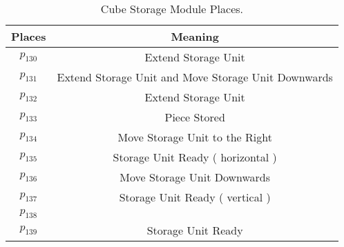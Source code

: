 \begin{table}[htbp]
\caption{Cube Storage Module Places.}
\centering
\begin{tabular}{cc}
Places & Meaning\\
\hline
\hyperlink{partialNet:p130}{\hypertarget{partialTable:p130}{$p_{130}$}} & Extend Storage Unit\\
\hyperlink{partialNet:p131}{\hypertarget{partialTable:p131}{$p_{131}$}} & Extend Storage Unit and Move Storage Unit Downwards\\
\hyperlink{partialNet:p132}{\hypertarget{partialTable:p132}{$p_{132}$}} & Extend Storage Unit\\
\hyperlink{partialNet:p133}{\hypertarget{partialTable:p133}{$p_{133}$}} & Piece Stored\\
\hyperlink{partialNet:p134}{\hypertarget{partialTable:p134}{$p_{134}$}} & Move Storage Unit to the Right\\
\hyperlink{partialNet:p135}{\hypertarget{partialTable:p135}{$p_{135}$}} & Storage Unit Ready ( horizontal )\\
\hyperlink{partialNet:p136}{\hypertarget{partialTable:p136}{$p_{136}$}} & Move Storage Unit Downwards\\
\hyperlink{partialNet:p137}{\hypertarget{partialTable:p137}{$p_{137}$}} & Storage Unit Ready ( vertical )\\
\hyperlink{partialNet:p138}{\hypertarget{partialTable:p138}{$p_{138}$}} & \\
\hyperlink{partialNet:p139}{\hypertarget{partialTable:p139}{$p_{139}$}} & Storage Unit Ready\\
\end{tabular}
\end{table}

